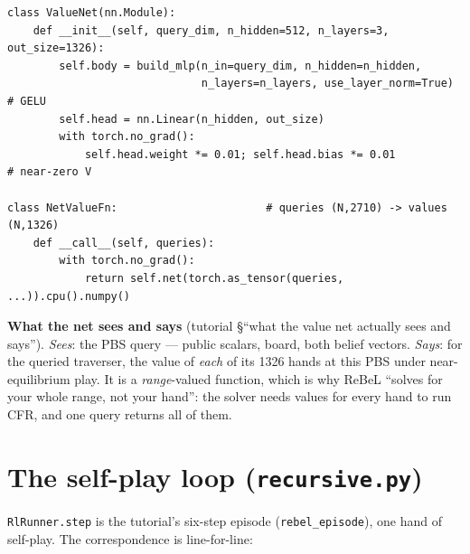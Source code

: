 \documentclass[11pt,a4paper]{article}
\newcommand{\file}[1]{\textcolor{accent}{\texttt{#1}}}
\newcommand{\fn}[1]{\texttt{#1}}
\begin{document}
\begin{lstlisting}[style=py, caption={\file{models.py} --- the net and the numpy adapter the solver calls. \fn{NetValueFn} is the bridge: numpy queries in, numpy values out, eval/no-grad, on the net's device. Card-removal/opp-mass scaling is the solver's job (previous section).}]
class ValueNet(nn.Module):
    def __init__(self, query_dim, n_hidden=512, n_layers=3, out_size=1326):
        self.body = build_mlp(n_in=query_dim, n_hidden=n_hidden,
                              n_layers=n_layers, use_layer_norm=True)   # GELU
        self.head = nn.Linear(n_hidden, out_size)
        with torch.no_grad():
            self.head.weight *= 0.01; self.head.bias *= 0.01            # near-zero V

class NetValueFn:                       # queries (N,2710) -> values (N,1326)
    def __call__(self, queries):
        with torch.no_grad():
            return self.net(torch.as_tensor(queries, ...)).cpu().numpy()
\end{lstlisting}

\begin{intuition}
\textbf{What the net sees and says} (tutorial §``what the value net actually sees
and says''). \emph{Sees}: the PBS query --- public scalars, board, both belief
vectors. \emph{Says}: for the queried traverser, the value of \emph{each} of its
1326 hands at this PBS under near-equilibrium play. It is a \emph{range}-valued
function, which is why ReBeL ``solves for your whole range, not your hand'': the
solver needs values for every hand to run CFR, and one query returns all of them.
\end{intuition}

\section{The self-play loop (\file{recursive.py})}

\fn{RlRunner.step} is the tutorial's six-step episode (\texttt{rebel\_episode}),
one hand of self-play. The correspondence is line-for-line:
\end{document}
